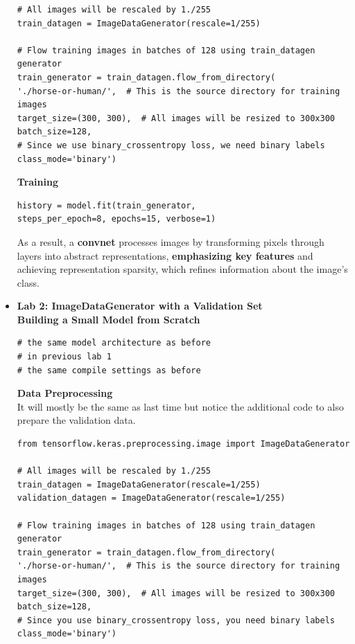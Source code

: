 \documentclass[20pt]{article}
\begin{document}
\begin{itemize}
\begin{verbatim}
# All images will be rescaled by 1./255
train_datagen = ImageDataGenerator(rescale=1/255)

# Flow training images in batches of 128 using train_datagen generator
train_generator = train_datagen.flow_from_directory(
'./horse-or-human/',  # This is the source directory for training images
target_size=(300, 300),  # All images will be resized to 300x300
batch_size=128,
# Since we use binary_crossentropy loss, we need binary labels
class_mode='binary')
		\end{verbatim}
		\textbf{Training}\\
		\begin{verbatim}
history = model.fit(train_generator,
steps_per_epoch=8, epochs=15, verbose=1)
		\end{verbatim}
		As a result, a \textbf{convnet} processes images by transforming pixels through layers into abstract representations, \textbf{emphasizing key features} and achieving representation sparsity, which refines information about the image's class.
		\item \textbf{Lab 2: ImageDataGenerator with a Validation Set}\\
		\textbf{Building a Small Model from Scratch}
		\begin{verbatim}
# the same model architecture as before
# in previous lab 1
# the same compile settings as before
		\end{verbatim}
		\textbf{Data Preprocessing}\\
		It will mostly be the same as last time but notice the additional code to also prepare the validation data.
		\begin{verbatim}
from tensorflow.keras.preprocessing.image import ImageDataGenerator

# All images will be rescaled by 1./255
train_datagen = ImageDataGenerator(rescale=1/255)
validation_datagen = ImageDataGenerator(rescale=1/255)

# Flow training images in batches of 128 using train_datagen generator
train_generator = train_datagen.flow_from_directory(
'./horse-or-human/',  # This is the source directory for training images
target_size=(300, 300),  # All images will be resized to 300x300
batch_size=128,
# Since you use binary_crossentropy loss, you need binary labels
class_mode='binary')


\end{verbatim}
\end{itemize}
\end{document}
